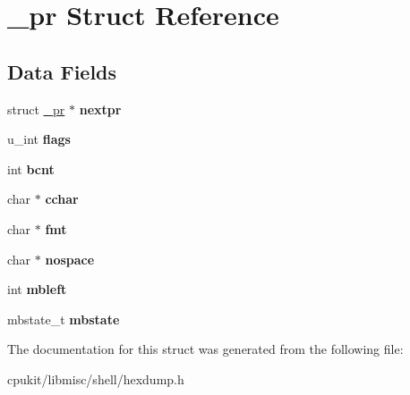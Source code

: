\hypertarget{struct__pr}{}\section{\+\_\+pr Struct Reference}
\label{struct__pr}
\subsection*{Data Fields}
\begin{DoxyCompactItemize}
\item 
\mbox{\label{struct__pr_a88cc33fbcc14c571d050bad0d16847ff}} 
struct \mbox{\hyperlink{struct__pr}{\+\_\+pr}} $\ast$ {\bfseries nextpr}
\item 
\mbox{\label{struct__pr_acd44e2f45ad3578a63b8b473e1a1bea2}} 
u\+\_\+int {\bfseries flags}
\item 
\mbox{\label{struct__pr_aaae48a263480342526ed448be26e2b53}} 
int {\bfseries bcnt}
\item 
\mbox{\label{struct__pr_a4a8c023851016e2c94a37848eba6c498}} 
char $\ast$ {\bfseries cchar}
\item 
\mbox{\label{struct__pr_a5fcf2dea78c34d4113505d9de7067cbc}} 
char $\ast$ {\bfseries fmt}
\item 
\mbox{\label{struct__pr_acceafe687e1c4b79dd491f68036a1baa}} 
char $\ast$ {\bfseries nospace}
\item 
\mbox{\label{struct__pr_a1cffa82b66d9eff429aa6bf29fd80c5b}} 
int {\bfseries mbleft}
\item 
\mbox{\label{struct__pr_a869b0cf3dcd18e1f1bd850558fe93a13}} 
mbstate\+\_\+t {\bfseries mbstate}
\end{DoxyCompactItemize}


The documentation for this struct was generated from the following file\+:\begin{DoxyCompactItemize}
\item 
cpukit/libmisc/shell/hexdump.\+h\end{DoxyCompactItemize}
